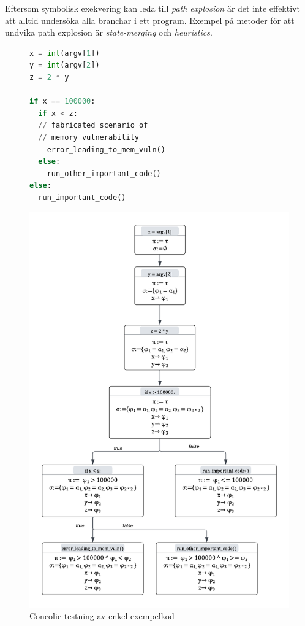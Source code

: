 Eftersom symbolisk exekvering kan leda till \emph{path explosion} är det inte effektivt 
att alltid undersöka alla branchar i ett program. Exempel på metoder för att undvika 
path explosion är \emph{state-merging} och \emph{heuristics}. 

\begin{figure}[H]
\centering
\begin{lstlisting}[label={list:first}, language=Python, frame=single]
x = int(argv[1])
y = int(argv[2])
z = 2 * y

if x == 100000: 
  if x < z:
  // fabricated scenario of 
  // memory vulnerability
    error_leading_to_mem_vuln()
  else:
    run_other_important_code()
else:
  run_important_code()

\end{lstlisting}
\caption{}
\end{figure}

\begin{figure}[H]
\centering
\includegraphics[scale=0.5]{figures/final_symbolic_example_graph.png}
\caption{Concolic testning av enkel exempelkod}
\end{figure}


